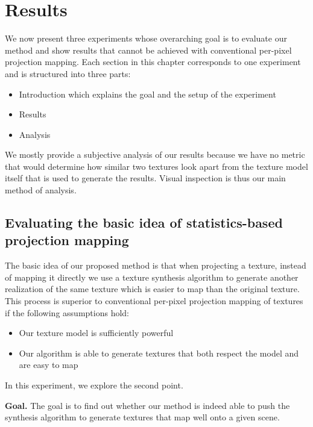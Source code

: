 \chapter{Results}
\label{chapter:results}

We now present three experiments whose overarching goal is to evaluate our method and show results that cannot be achieved with conventional per-pixel projection mapping. Each section in this chapter corresponds to one experiment and is structured into three parts: 

\begin{itemize}
    \item Introduction which explains the goal and the setup of the experiment
    \item Results
    \item Analysis
\end{itemize}

We mostly provide a subjective analysis of our results because we have no metric that would determine how similar two textures look apart from the texture model itself that is used to generate the results. Visual inspection is thus our main method of analysis.

\section{Evaluating the basic idea of statistics-based projection mapping}
\label{section:results-experiments-01}

The basic idea of our proposed method is that when projecting a texture, instead of mapping it directly we use a texture synthesis algorithm to generate another realization of the same texture which is easier to map than the original texture. This process is superior to conventional per-pixel projection mapping of textures if the following assumptions hold:

\begin{itemize}
    \item Our texture model is sufficiently powerful
    \item Our algorithm is able to generate textures that both respect the model and are easy to map
\end{itemize}

In this experiment, we explore the second point.

\textbf{Goal.} The goal is to find out whether our method is indeed able to push the synthesis algorithm to generate textures that map well onto a given scene.

